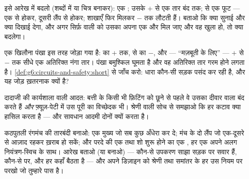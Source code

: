\begin{exercise}[$\star\star$]\label{exo:g6:circuits-and-safety:9}
इसे आरेख में बदलो (शब्दों में या चित्र बनाकर): एक ; उसके $+$ से
एक तार बंद  तक;  से एक फूट --- एक   से होकर, दूसरी
लैंप से होकर; शाखाएँ फिर मिलकर $-$ तक लौटती हैं। बताओ कि क्या सुनाई
और क्या दिखाई देगा, और अगर सिर्फ़  वाली  को उसका अपना एक और
 मिल जाए और वह खुला हो, तो क्या बदलेगा।
\end{exercise}

\begin{exercise}[$\star\star$]\label{exo:g6:circuits-and-safety:10}
एक खिलौना पंखा इस तरह जोड़ा गया है:  का $+$  तक,  से
 का $-$, और --- ``मज़बूती के लिए'' --- $+$ से $-$ तक सीधे एक
अतिरिक्त नंगा तार। पंखा बमुश्किल घूमता है और वह अतिरिक्त तार गरम होने
लगता है। \cref{def:g6:circuits-and-safety:short} से जाँच करो: धारा
कौन-सी सड़क पसंद कर रही है, और यह जोड़ ख़तरनाक क्यों है?
\end{exercise}

\begin{exercise}[$\star\star$]\label{exo:g6:circuits-and-safety:11}
दादाजी की कार्यशाला वाली आदत: बत्ती के किसी भी फ़िटिंग को छूने से
पहले वे उसका दीवार वाला  बंद करते हैं \emph{और} फ़्यूज़-पेटी में
उस पूरी  का विच्छेदक भी। श्रेणी वाली सोच से समझाओ कि हर कटाव क्या
हासिल करता है --- और सावधान आदमी दोनों क्यों करता है।
\end{exercise}

\begin{exercise}[$\star\star\star$]\label{exo:g6:circuits-and-safety:12}
कठपुतली रंगमंच की तारबंदी बनाओ: एक मुख्य  जो सब कुछ अँधेरा कर दे;
मंच के दो लैंप जो एक-दूसरे से आज़ाद रहकर ख़राब हो सकें; और परदे की एक
 तथा शो शुरू होने का एक , हर एक अपने अलग नियंत्रण-स्विच के
साथ। आरेख बताओ (या बनाओ) --- कौन-से उपकरण साझा सड़क पर सवार हैं,
कौन-से  पर, और हर  कहाँ बैठता है --- और अपने डिज़ाइन को
श्रेणी तथा समांतर के हर उस नियम पर परखो जो तुम्हारे पास है।
\end{exercise}

